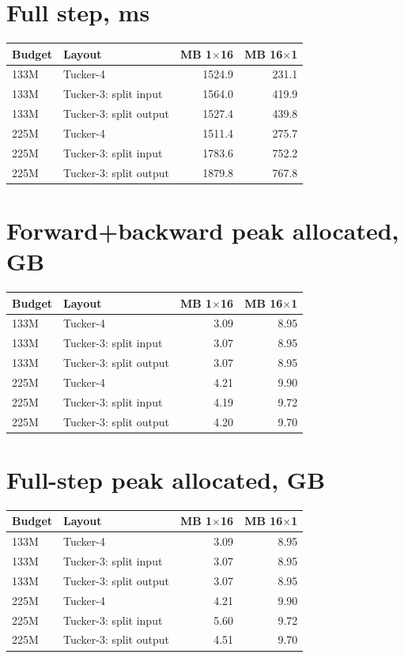 \documentclass[10pt]{article}
\begin{document}
\section{Full step, ms}
\begin{center}
\small
\begin{tabular}{llrr}
\toprule
\textbf{Budget} & \textbf{Layout} & \textbf{MB 1$\times$16} & \textbf{MB 16$\times$1} \\
\midrule
133M & Tucker-4 & 1524.9 & 231.1 \\
133M & Tucker-3: split input & 1564.0 & 419.9 \\
133M & Tucker-3: split output & 1527.4 & 439.8 \\
225M & Tucker-4 & 1511.4 & 275.7 \\
225M & Tucker-3: split input & 1783.6 & 752.2 \\
225M & Tucker-3: split output & 1879.8 & 767.8 \\
\bottomrule
\end{tabular}
\end{center}
\section{Forward+backward peak allocated, GB}
\begin{center}
\small
\begin{tabular}{llrr}
\toprule
\textbf{Budget} & \textbf{Layout} & \textbf{MB 1$\times$16} & \textbf{MB 16$\times$1} \\
\midrule
133M & Tucker-4 & 3.09 & 8.95 \\
133M & Tucker-3: split input & 3.07 & 8.95 \\
133M & Tucker-3: split output & 3.07 & 8.95 \\
225M & Tucker-4 & 4.21 & 9.90 \\
225M & Tucker-3: split input & 4.19 & 9.72 \\
225M & Tucker-3: split output & 4.20 & 9.70 \\
\bottomrule
\end{tabular}
\end{center}
\section{Full-step peak allocated, GB}
\begin{center}
\small
\begin{tabular}{llrr}
\toprule
\textbf{Budget} & \textbf{Layout} & \textbf{MB 1$\times$16} & \textbf{MB 16$\times$1} \\
\midrule
133M & Tucker-4 & 3.09 & 8.95 \\
133M & Tucker-3: split input & 3.07 & 8.95 \\
133M & Tucker-3: split output & 3.07 & 8.95 \\
225M & Tucker-4 & 4.21 & 9.90 \\
225M & Tucker-3: split input & 5.60 & 9.72 \\
225M & Tucker-3: split output & 4.51 & 9.70 \\
\bottomrule
\end{tabular}
\end{center}
\end{document}
